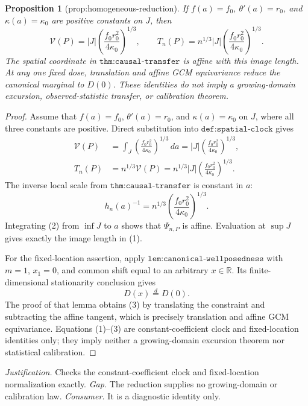 \documentclass{article}
\newtheorem{proposition}{Proposition}
\begin{document}
\begin{proposition}[prop:homogeneous-reduction]\label{prop:homogeneous-reduction}
If \(f(a)=f_0\), \(\theta'(a)=r_0\), and \(\kappa(a)=\kappa_0\) are positive constants on \(J\), then
\[
 \mathcal V(P)=|J|\left(\frac{f_0r_0^2}{4\kappa_0}\right)^{1/3},
 \qquad
 T_n(P)=n^{1/3}|J|\left(\frac{f_0r_0^2}{4\kappa_0}\right)^{1/3}.
\]
The spatial coordinate in \(\texttt{thm:causal-transfer}\) is affine with this image length. At any one fixed dose, translation and affine GCM equivariance reduce the canonical marginal to \(D(0)\). These identities do not imply a growing-domain excursion, observed-statistic transfer, or calibration theorem.
\end{proposition}
\begin{proof}
Assume that \(f(a)=f_0\), \(\theta'(a)=r_0\), and \(\kappa(a)=\kappa_0\) on \(J\), where all three constants are positive.  Direct substitution into \(\texttt{def:spatial-clock}\) gives
\[
 \begin{aligned}
 \mathcal V(P)
 &=\int_J\left(\frac{f_0r_0^2}{4\kappa_0}\right)^{1/3}\,da
 =|J|\left(\frac{f_0r_0^2}{4\kappa_0}\right)^{1/3},\\
 T_n(P)
 &=n^{1/3}\mathcal V(P)
 =n^{1/3}|J|\left(\frac{f_0r_0^2}{4\kappa_0}\right)^{1/3}.
 \end{aligned} \tag{1}
\]
The inverse local scale from \(\texttt{thm:causal-transfer}\) is constant in \(a\):
\[
 h_n(a)^{-1}=n^{1/3}
 \left(\frac{f_0r_0^2}{4\kappa_0}\right)^{1/3}. \tag{2}
\]
Integrating (2) from \(\inf J\) to \(a\) shows that \(\Psi_{n,P}\) is affine.  Evaluation at \(\sup J\) gives exactly the image length in (1).

For the fixed-location assertion, apply \(\texttt{lem:canonical-wellposedness}\) with \(m=1\), \(x_1=0\), and common shift equal to an arbitrary \(x\in\mathbb R\).  Its finite-dimensional stationarity conclusion gives
\[
 D(x)\stackrel{d}{=}D(0). \tag{3}
\]
The proof of that lemma obtains (3) by translating the constraint and subtracting the affine tangent, which is precisely translation and affine GCM equivariance.  Equations (1)--(3) are constant-coefficient clock and fixed-location identities only; they imply neither a growing-domain excursion theorem nor statistical calibration.
\end{proof}
\par\smallskip\noindent \textit{Justification.} Checks the constant-coefficient clock and fixed-location normalization exactly. \textit{Gap.} The reduction supplies no growing-domain or calibration law. \textit{Consumer.} It is a diagnostic identity only.
\end{document}
